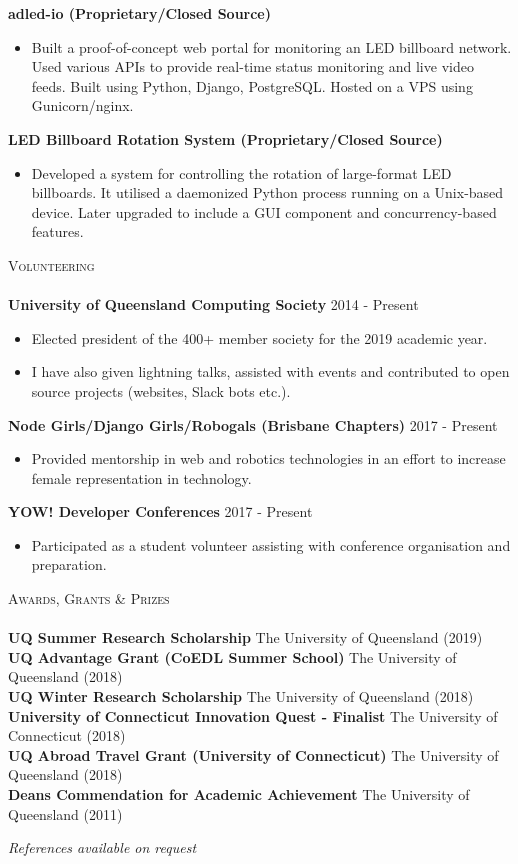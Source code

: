 \documentclass[a4paper]{article}
\newcommand{\lineunder} {
    \vspace*{-8pt} \\
    \hspace*{-10pt} \hrulefill \\
}
\newcommand{\header} [1] {
    {\hspace*{-10pt}\vspace*{6pt} \textsc{#1}}
    \vspace*{-6pt} \lineunder
}
\newenvironment{singleitem}
{   \small
    \vspace{-2.6pt}
    \begin{itemize}
    \setlength{\itemsep}{0pt}
    \setlength{\parskip}{0pt}
    \setlength{\parsep}{0pt}   }
{\end{itemize} \vspace{-2.6pt}	}
\begin{document}
\textbf{adled-io (Proprietary/Closed Source)}
\begin{singleitem}
	\item Built a proof-of-concept web portal for monitoring an LED billboard network. Used various APIs to provide real-time status monitoring and live video feeds. Built using Python, Django, PostgreSQL. Hosted on a VPS using Gunicorn/nginx.
\end{singleitem}

\textbf{LED Billboard Rotation System (Proprietary/Closed Source)}
\begin{singleitem}
	\item Developed a system for controlling the rotation of large-format LED billboards. It utilised a daemonized Python process running on a Unix-based device. Later upgraded to include a GUI component and concurrency-based features.
\end{singleitem}

\vspace{0mm}

\header{Volunteering}
\textbf{University of Queensland Computing Society} \hfill 2014 - Present\\
\begin{singleitem}
	\item Elected president of the 400+ member society for the 2019 academic year.
	\item I have also given lightning talks, assisted with events and contributed to open source projects (websites, Slack bots etc.).
\end{singleitem}
\textbf{Node Girls/Django Girls/Robogals (Brisbane Chapters)} \hfill 2017 - Present\\
\begin{singleitem}
	\item Provided mentorship in web and robotics technologies in an effort to increase female representation in technology.
\end{singleitem}
\textbf{YOW! Developer Conferences} \hfill 2017 - Present\\
\begin{singleitem}
	\item Participated as a student volunteer assisting with conference organisation and preparation.
\end{singleitem}

\header{Awards, Grants \& Prizes}
\textbf{UQ Summer Research Scholarship} \hfill The University of Queensland (2019)\\
\textbf{UQ Advantage Grant (CoEDL Summer School)} \hfill The University of Queensland (2018)\\
\textbf{UQ Winter Research Scholarship} \hfill The University of Queensland (2018)\\
\textbf{University of Connecticut Innovation Quest - Finalist} \hfill The University of Connecticut (2018)\\
\textbf{UQ Abroad Travel Grant (University of Connecticut)} \hfill The University of Queensland (2018)\\
\textbf{Dean\textquotesingle{}s Commendation for Academic Achievement} \hfill The University of Queensland (2011)\\


\vspace{3mm}
\begin{center}
\small \textit{References available on request}
\end{center}
\end{document}
